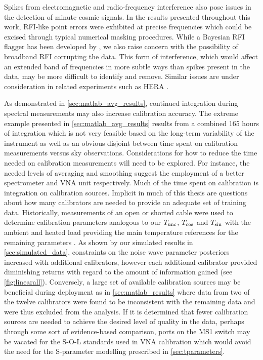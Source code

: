 Spikes from electromagnetic and radio-frequency interference also pose issues in the detection of minute cosmic signals. In the results presented throughout this work, RFI-like point errors were exhibited at precise frequencies which could be excised through typical numerical masking procedures. While a Bayesian RFI flagger has been developed by \citet{sam_rfi}, we also raise concern with the possibility of broadband RFI corrupting the data. This form of interference, which would affect an extended band of frequencies in more subtle ways than spikes present in the data, may be more difficult to identify and remove. Similar issues are under consideration in related experiments such as HERA \citep{hera_rfi}.

As demonstrated in \cref{sec:matlab_avg_results}, continued integration during spectral measurements may also increase calibration accuracy. The extreme example presented in \cref{sec:matlab_avg_results} results from a combined 165 hours of integration which is not very feasible based on the long-term variability of the instrument as well as an obvious disjoint between time spent on calibration measurements versus sky observations. Considerations for how to reduce the time needed on calibration measurements will need to be explored. For instance, the needed levels of averaging and smoothing suggest the employment of a better spectrometer and VNA unit respectively. Much of the time spent on calibration is integration on calibration sources. Implicit in much of this thesis are questions about how many calibrators are needed to provide an adequate set of training data. Historically, measurements of an open or shorted cable were used to determine calibration parameters analogous to our $T_{\mathrm{unc}}$, $T_{\mathrm{cos}}$ and $T_{\mathrm{sin}}$ \citep{rogersCal} with the ambient and heated load providing the main temperature references for the remaining parameters \citep{edgesCal}. As shown by our simulated results in \cref{sec:simulated_data}, constraints on the noise wave parameter posteriors increased with additional calibrators, however each additional calibrator provided diminishing returns with regard to the amount of information gained (see \cref{fig:linearall}). Conversely, a large set of available calibration sources may be beneficial during deployment as in \cref{sec:matlab_results} where data from two of the twelve calibrators were found to be inconsistent with the remaining data and were thus excluded from the analysis. If it is determined that fewer calibration sources are needed to achieve the desired level of quality in the data, perhaps through some sort of evidence-based comparison, ports on the MS1 switch may be vacated for the S-O-L standards used in VNA calibration which would avoid the need for the S-parameter modelling prescribed in \cref{sec:tparameters}.

